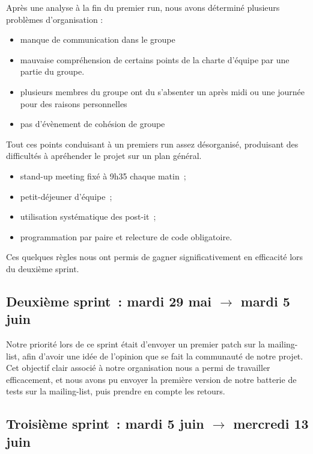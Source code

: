 \documentclass[11pt]{article}
\begin{document}
Après une analyse à la fin du premier run, nous avons déterminé plusieurs problèmes d'organisation : 

\begin{itemize}
\item manque de communication dans le groupe
\item mauvaise compréhension de certains points de la charte d'équipe par une partie du groupe.
\item plusieurs membres du groupe ont du s'absenter un après midi ou une journée pour des raisons personnelles
\item pas d'évènement de cohésion de groupe
\end{itemize}

Tout ces points conduisant à un premiers run assez désorganisé, produisant des difficultés à apréhender le projet sur un plan général.

\begin{itemize}
\item stand-up meeting fixé à 9h35 chaque matin~;
\item petit-déjeuner d'équipe~;
\item utilisation systématique des post-it~;
\item programmation par paire et relecture de code obligatoire.
\end{itemize}

  Ces quelques règles nous ont permis de gagner significativement en
  efficacité lors du deuxième sprint.

  \subsection{Deuxième sprint~: mardi 29 mai $\rightarrow$ mardi 5 juin}

  Notre priorité lors de ce sprint était d'envoyer un premier patch sur
  la mailing-list, afin d'avoir une idée de l'opinion que se fait la
  communauté de notre projet. Cet objectif clair associé à notre
  organisation nous a permi de travailler efficacement, et nous avons pu
  envoyer la première version de notre batterie de tests sur la
  mailing-list, puis prendre en compte les retours.

  \subsection{Troisième sprint~: mardi 5 juin $\rightarrow$ mercredi 13 juin}
\end{document}
